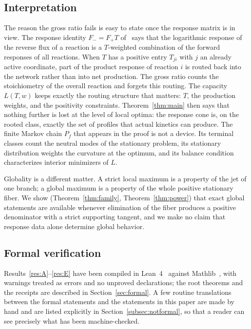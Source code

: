 \documentclass[11pt,reqno]{amsart}
\theoremstyle{plain}
\theoremstyle{definition}
\theoremstyle{remark}
\numberwithin{equation}{section}
\begin{document}
\subsection{Interpretation}
The reason the gross ratio fails is easy to state once the response matrix is in view.  The response identity $F_-=F_+T$ of~\cite{DDL24} says that the logarithmic response of the reverse flux of a reaction is a $T$-weighted combination of the forward responses of all reactions.  When $T$ has a positive entry $T_{ji}$ with $j$ an already active coordinate, part of the product response of reaction $i$ is routed back into the network rather than into net production.  The gross ratio counts the stoichiometry of the overall reaction and forgets this routing.  The capacity $L(T,w)$ keeps exactly the routing structure that matters: $T$, the production weights, and the positivity constraints.  Theorem~\ref{thm:main} then says that nothing further is lost at the level of local optima: the response cone is, on the rooted class, exactly the set of profiles that actual kinetics can produce.  The finite Markov chain $P_f$ that appears in the proof is not a device.  Its terminal classes count the neutral modes of the stationary problem, its stationary distribution weights the curvature at the optimum, and its balance condition characterizes interior minimizers of $L$.

Globality is a different matter.  A strict local maximum is a property of the jet of one branch; a global maximum is a property of the whole positive stationary fiber.  We show (Theorem~\ref{thm:family}, Theorem~\ref{thm:power}) that exact global statements are available whenever elimination of the fiber produces a positive denominator with a strict supporting tangent, and we make no claim that response data alone determine global behavior.

\subsection{Formal verification}
Results~\ref{res:A}--\ref{res:E} have been compiled in Lean~4~\cite{dMU21} against Mathlib~\cite{mathlib20}, with warnings treated as errors and no unproved declarations; the root theorems and the receipts are described in Section~\ref{sec:formal}.  A few routine translations between the formal statements and the statements in this paper are made by hand and are listed explicitly in Section~\ref{subsec:notformal}, so that a reader can see precisely what has been machine-checked.
\end{document}
